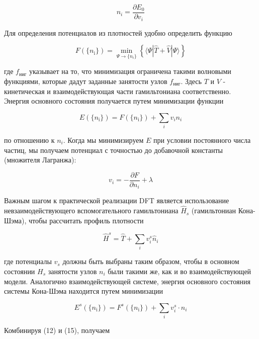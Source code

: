 \documentclass[a4paper,14pt]{extarticle}
\begin{document}
\begin{equation}
    n_i = \frac{\partial E_0}{\partial v_i}
    \end{equation}

Для определения потенциалов из плотностей удобно определить функцию

\begin{equation}
    F(\{n_{\text{i}}\}) = \min_{\Psi\rightarrow\{n_{i}\}} \left\{ \langle\Psi|\hat{T} +\hat{V}|\Psi\rangle\right\}
\end{equation}

где $f_{\text{ниг}}$ указывает на то, что минимизация ограничена такими волновыми функциями, которые дадут заданные занятости узлов $f_{\text{ниг}}$. Здесь $T$ и $V$ - кинетическая и взаимодействующая части гамильтониана соответственно. Энергия основного состояния получается путем минимизации функции

\begin{equation}
    E(\{n_{\text{i}}\}) = F(\{n_{\text{i}}\}) + \sum_{i} v_i n_i
    \end{equation}

по отношению к $n_i$. Когда мы минимизируем $E$ при условии постоянного числа частиц, мы получаем потенциал с точностью до добавочной константы (множителя Лагранжа):

\begin{equation}
    v_i = -\frac{\partial F}{\partial n_i} + \lambda
\end{equation}

Важным шагом к практической реализации DFT является использование невзаимодействующего вспомогательного гамильтониана $\hat{H}_s$ (гамильтониан Кона-Шэма), чтобы рассчитать профиль плотности

\begin{equation}
    \hat{H}^{s} = \hat{T} + \sum_i v^{s}_{i} \hat{n}_i
\end{equation}

где потенциалы $v_s$ должны быть выбраны таким образом, чтобы в основном состоянии $H_s$ занятости узлов $n_i$ были такими же, как и во взаимодействующей модели. Аналогично взаимодействующей системе, энергия основного состояния системы Кона-Шэма находится путем минимизации

\begin{equation}
    E^{s}(\{n_{\text{i}}\})= F^{s}(\{n_{\text{i}}\}) + \sum_i v^{s}_{i} \cdot n_{i}
\end{equation}

Комбинируя (12) и (15), получаем
\end{document}
